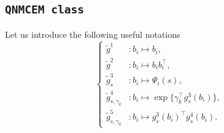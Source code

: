 \documentclass[11pt]{article}
\begin{document}
\subsection{\texttt{QNMCEM class}}
\label{sec:QNMCEM class}

Let us introduce the following useful notations
\begin{equation}
  \label{eq:g-tilde}
  \left\{
    \begin{array}{ll}
    \tilde g^1&: b_i \mapsto b_i,\\
    \tilde g^2&: b_i \mapsto b_ib_i^\top, \\
    \tilde g^3_{s}&: b_i \mapsto \Psi_i(s), \\
    \tilde g^4_{s, \gamma_k}&: b_i \mapsto \exp \big\{\gamma_k^\top g^3_{s}(b_i) \big\}, \\
    \tilde g^5_{s, \gamma_k}&: b_i \mapsto g^3_{s}(b_i)^\top g^4_{s}(b_i).
    \end{array}
  \right. 
\end{equation}



{}
\end{document}
